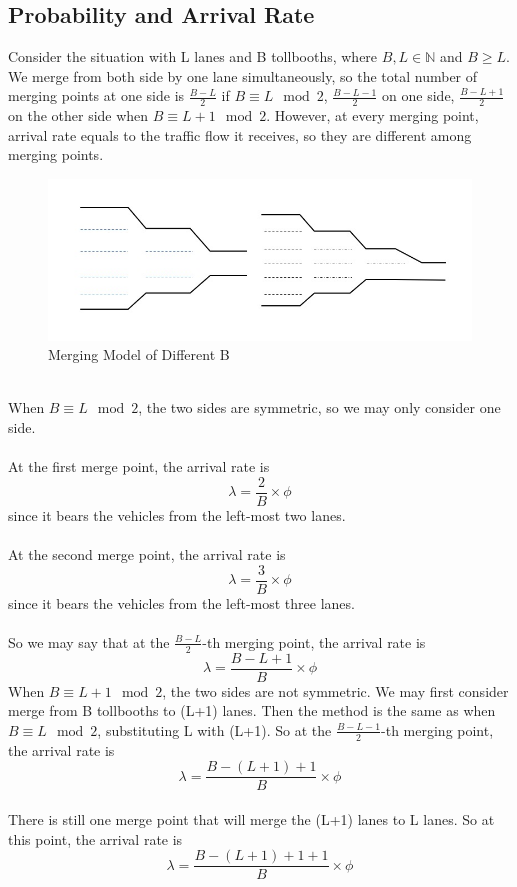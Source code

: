 \subsection{Probability and Arrival Rate}
Consider the situation with L lanes and B tollbooths, where \(B, L \in \mathbb{N}\) and \(B\geqslant L\). We merge from both side by one lane simultaneously, so the total number of merging points at one side is \(\frac{B-L}{2}\) if \(B \equiv L \mod 2\), \(\frac{B-L-1}{2}\) on one side, \(\frac{B-L+1}{2}\) on the other side when \(B \equiv L+1 \mod 2\). However, at every merging point, arrival rate equals to the traffic flow it receives, so they are different among merging points.\\
\begin{figure}[h]
\small
\centering
\includegraphics[width=12cm]{562831237.jpg}
\caption{Merging Model of Different B} \label{fig: Merging Model of Different B}
\end{figure}
\\
When  \(B \equiv L \mod 2\), the two sides are symmetric, so we may only consider one side.\\
\\
At the first merge point, the arrival rate is\\
\[
\lambda = \frac{2}{B} \times \phi
\]
since it bears the vehicles from the left-most two lanes.\\
\\
\noindent
At the second merge point, the arrival rate is\\
\[
\lambda = \frac{3}{B} \times \phi
\]
since it bears the vehicles from the left-most three lanes.\\
\\
So we may say that at the \(\frac{B-L}{2}\)-th merging point, the arrival rate is\\
\[
\lambda = \frac{B-L+1}{B} \times \phi
\]
When \(B \equiv L+1\mod 2\), the two sides are not symmetric. We may first consider merge from B tollbooths to (L+1) lanes. Then the method is the same as when \(B \equiv L \mod 2\), substituting L with (L+1). So at the \(\frac{B-L-1}{2}\)-th merging point, the arrival rate is\\
\[
\lambda = \frac{B-(L+1)+1}{B} \times \phi
\]
\\
There is still one merge point that will merge the (L+1) lanes to L lanes. So at this point, the arrival rate is\\ 
\[
\lambda = \frac{B-(L+1)+1+1}{B} \times \phi
\]

